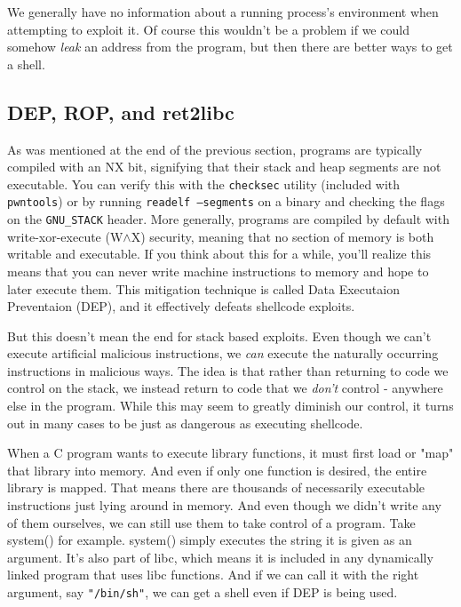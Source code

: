 \documentclass{article}
\begin{document}
We generally have no information about a running process's environment when
attempting to exploit it. Of course this wouldn't be a problem if we could
somehow \emph{leak} an address from the program, but then there are better ways
to get a shell.

\subsection{DEP, ROP, and ret2libc}
As was mentioned at the end of the previous section, programs are typically
compiled with an NX bit, signifying that their stack and heap segments are not
executable. You can verify this with the \texttt{checksec} utility (included
with \texttt{pwntools}) or by running \texttt{readelf --segments} on a
binary and checking the flags on the \texttt{GNU\_STACK} header. More generally,
programs are compiled by default with write-xor-execute (W$\wedge$X) security,
meaning that no section of memory is both writable and executable. If you think
about this for a while, you'll realize this means that you can never write
machine instructions to memory and hope to later execute them. This mitigation
technique is called Data Executaion Preventaion (DEP), and it effectively
defeats shellcode exploits.

But this doesn't mean the end for stack based exploits. Even though we can't
execute artificial malicious instructions, we \emph{can} execute the naturally
occurring instructions in malicious ways. The idea is that rather than returning
to code we control on the stack, we instead return to code that we \emph{don't}
control - anywhere else in the program. While this may seem to greatly diminish
our control, it turns out in many cases to be just as dangerous as executing
shellcode.

When a C program wants to execute library functions, it must first load or
"map" that library into memory. And even if only one function is desired, the
entire library is mapped. That means there are thousands of necessarily
executable instructions just lying around in memory. And even though we didn't
write any of them ourselves, we can still use them to take control of a
program. Take system() for example. system() simply executes the string it is
given as an argument. It's also part of libc, which means it is included in any
dynamically linked program that uses libc functions. And if we can call it with
the right argument, say \texttt{"/bin/sh"}, we can get a shell even if DEP is
being used.
\end{document}
